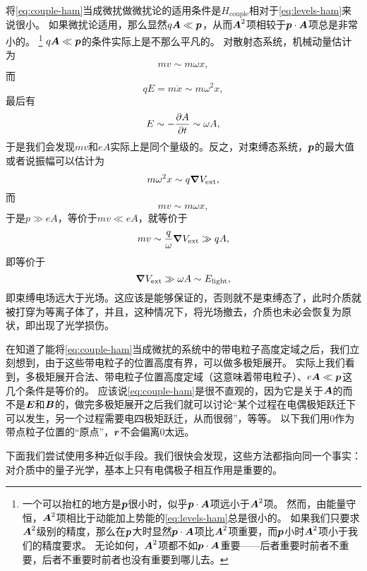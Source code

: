 \documentclass[UTF8, a4paper]{ctexart}
\begin{document}
将\eqref{eq:couple-ham}当成微扰做微扰论的适用条件是$H_\text{couple}$相对于\eqref{eq:levels-ham}来说很小。
如果微扰论适用，那么显然$q \vb*{A} \ll \vb*{p}$，从而$\vb*{A}^2$项相较于$\vb*{p} \cdot \vb*{A}$项总是非常小的。%
\footnote{
    一个可以抬杠的地方是$\vb*{p}$很小时，似乎$\vb*{p} \cdot \vb*{A}$项远小于$\vb*{A}^2$项。
    然而，由能量守恒，$\vb*{A}^2$项相比于动能加上势能的\eqref{eq:levels-ham}总是很小的。
    如果我们只要求$\vb*{A}^2$级别的精度，那么在$\vb*{p}$大时显然$\vb*{p} \cdot \vb*{A}$项比$\vb*{A}^2$项重要，而$\vb*{p}$小时$\vb*{A}^2$项小于我们的精度要求。
    无论如何，$\vb*{A}^2$项都不如$\vb*{p} \cdot \vb*{A}$重要——后者重要时前者不重要，后者不重要时前者也没有重要到哪儿去。
}%
$q \vb*{A} \ll \vb*{p}$的条件实际上是不那么平凡的。
对散射态系统，机械动量估计为
\[
    m v \sim m \omega x,
\]
而
\[
    q E = m \ddot{x} \sim m \omega^2 x,
\]
最后有
\[
    E \sim - \pdv{A}{t} \sim \omega A,
\]
于是我们会发现$mv$和$eA$实际上是同个量级的。反之，对束缚态系统，$\vb*{p}$的最大值或者说振幅可以估计为
\[
    m \omega^2 x \sim q \grad{V_\text{ext}},
\]
而
\[
    mv \sim m \omega x,
\]
于是$p \gg eA$，等价于$mv \ll eA$，就等价于
\[
    mv \sim \frac{q}{\omega} \grad{V_\text{ext}} \gg q A,
\]
即等价于
\begin{equation}
    \grad{V_\text{ext}} \gg \omega A \sim E_\text{light},
\end{equation}
即束缚电场远大于光场。这应该是能够保证的，否则就不是束缚态了，此时介质就被打穿为等离子体了，并且，这种情况下，将光场撤去，介质也未必会恢复为原状，即出现了光学损伤。

在知道了能将\eqref{eq:couple-ham}当成微扰的系统中的带电粒子高度定域之后，我们立刻想到，由于这些带电粒子的位置高度有界，可以做多极矩展开。
实际上我们看到，多极矩展开合法、带电粒子位置高度定域（这意味着带电粒子）、$e \vb*{A} \ll \vb*{p}$这几个条件是等价的。
应该说\eqref{eq:couple-ham}是很不直观的，因为它是关于$\vb*{A}$的而不是$\vb*{E}$和$\vb*{B}$的，做完多极矩展开之后我们就可以讨论“某个过程在电偶极矩跃迁下可以发生，另一个过程需要电四极矩跃迁，从而很弱”，等等。
以下我们用$0$作为带点粒子位置的“原点”，$\vb*{r}$不会偏离$0$太远。

下面我们尝试使用多种近似手段。我们很快会发现，这些方法都指向同一个事实：对介质中的量子光学，基本上只有电偶极子相互作用是重要的。
\end{document}
